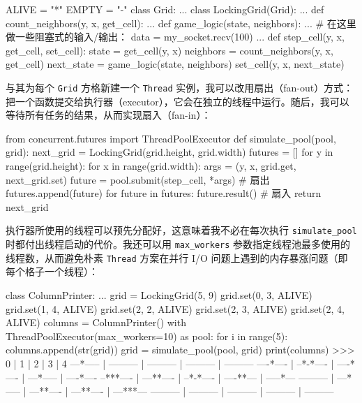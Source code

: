 \begin{codebox}[python]
ALIVE = "*"
EMPTY = "-"
class Grid:
    ...
class LockingGrid(Grid):
    ...
def count_neighbors(y, x, get_cell):
    ...
def game_logic(state, neighbors):
    ...
    # 在这里做一些阻塞式的输入/输出：
    data = my_socket.recv(100)
    ...
def step_cell(y, x, get_cell, set_cell):
    state = get_cell(y, x)
    neighbors = count_neighbors(y, x, get_cell)
    next_state = game_logic(state, neighbors)
    set_cell(y, x, next_state)
\end{codebox}

与其为每个 \texttt{Grid} 方格新建一个 \texttt{Thread} 实例，我可以改用扇出（fan-out）方式：把一个函数提交给执行器（executor），它会在独立的线程中运行。随后，我可以等待所有任务的结果，从而实现扇入（fan-in）：

\begin{codebox}[python]
from concurrent.futures import ThreadPoolExecutor
def simulate_pool(pool, grid):
    next_grid = LockingGrid(grid.height, grid.width)
    futures = []
    for y in range(grid.height):
        for x in range(grid.width):
            args = (y, x, grid.get, next_grid.set)
            future = pool.submit(step_cell, *args)  # 扇出
            futures.append(future)
    for future in futures:
        future.result()                             # 扇入
    return next_grid
\end{codebox}

执行器所使用的线程可以预先分配好，这意味着我不必在每次执行 \texttt{simulate\_pool} 时都付出线程启动的代价。我还可以用 \texttt{max\_workers} 参数指定线程池最多使用的线程数，从而避免朴素 \texttt{Thread} 方案在并行 I/O 问题上遇到的内存暴涨问题（即每个格子一个线程）：

\begin{codebox}[python]
class ColumnPrinter:
    ...
grid = LockingGrid(5, 9)
grid.set(0, 3, ALIVE)
grid.set(1, 4, ALIVE)
grid.set(2, 2, ALIVE)
grid.set(2, 3, ALIVE)
grid.set(2, 4, ALIVE)
columns = ColumnPrinter()
with ThreadPoolExecutor(max_workers=10) as pool:
    for i in range(5):
        columns.append(str(grid))
        grid = simulate_pool(pool, grid)
print(columns)
>>>
    0     |     1     |     2     |     3     |     4
---*----- | --------- | --------- | --------- | ---------
----*---- | --*-*---- | ----*---- | ---*----- | ----*----
--***---- | ---**---- | --*-*---- | ----**--- | -----*---
--------- | ---*----- | ---**---- | ---**---- | ---***---
--------- | --------- | --------- | --------- | ---------
\end{codebox}


